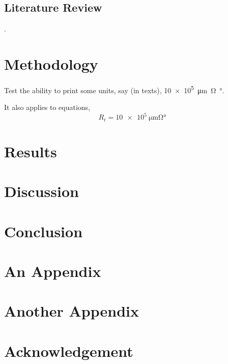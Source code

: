 \documentclass{senior-design}
\begin{document}
\section{Literature Review}
\lipsum[2]\cite{j.a.prufrock2009,li1999,ref1}.

\chapter{Methodology}

Test the ability to print some units, say (in texts), \SI{10e5}{\um\ohm\degree}.

It also applies to equations,
\begin{equation}
    R_{t}=\SI{10e5}{\um\ohm\degree}
\end{equation}
\chapter{Results}

\chapter{Discussion}

\chapter{Conclusion}


\renewcommand*{\UrlFont}{\rmfamily}
\printbibliography[title={References},heading=bibintoc]

\appendix
\chapter{An Appendix}

\chapter{Another Appendix}

\backmatter
\chapter{Acknowledgement}

\end{document}
